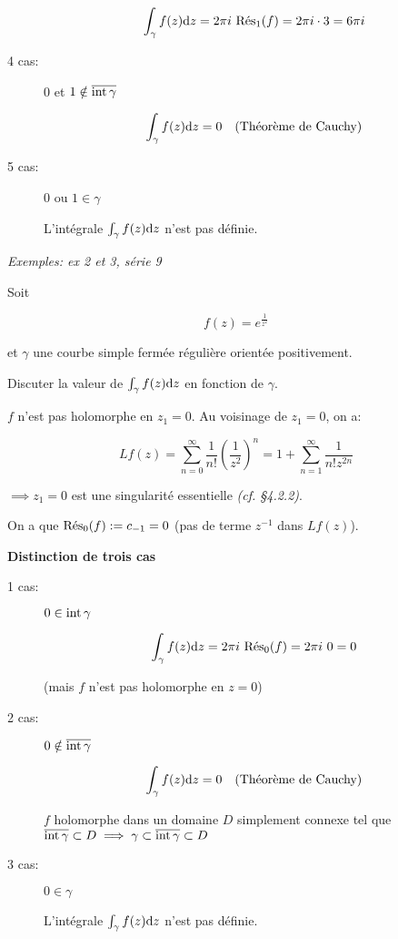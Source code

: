 \begin{example}[1]
\begin{description}
    \[ \int_\gamma f(z) \dz = 2\pi i \ \Res_{1}(f) = 2\pi i \cdot 3 = 6 \pi i \]
    
    \item[4\ieme{} cas:] 0 et $1 \notin \adh{\gamma}$
    
    \[ \int_\gamma f(z) \dz = 0 \quad \textrm{(Théorème de Cauchy)} \]
    
    \item[5\ieme{} cas:] 0 ou $1 \in \gamma$
    
    L'intégrale $\int_\gamma f(z) \dz$ n'est pas définie.
    \end{description}

    \textit{Exemples: ex 2 et 3, série 9}
\end{example}

\begin{example}[2]
    Soit
    
    \[ f(z) = e^{\frac{1}{z^2}} \]
    
    et $\gamma$ une courbe simple fermée régulière orientée positivement.
    
    Discuter la valeur de $\int_\gamma f(z) \dz$ en fonction de $\gamma$.
    
    $f$ n'est pas holomorphe en $z_1 = 0$.
    Au voisinage de $z_1 = 0$, on a:
    
    \[ Lf(z) = \sum_{n = 0}^\infty \frac{1}{n!} \left(\frac{1}{z^2}\right)^n =
    1 + \sum_{n = 1}^\infty \frac{1}{n!z^{2n}} \]
    
    $\implies z_1 = 0$ est une singularité essentielle \textit{(cf. §4.2.2)}.
    
    On a que $\Res_{0}(f) := c_{-1} = 0$ (pas de terme $z^{-1}$ dans $Lf(z)$).
    
    \textbf{Distinction de trois cas}
    
    \begin{description}
        \item[1\ier{} cas:] $0 \in \inte \gamma$
        
        \[ \int_\gamma f(z) \dz = 2\pi i \ \Res_{0}(f) = 2\pi i \ 0 = 0 \]
        
        (mais $f$ n'est pas holomorphe en $z = 0$)
        
        \item[2\ieme{} cas:] $0 \notin \adh{\gamma}$
        
        \[ \int_\gamma f(z) \dz = 0  \quad \textrm{(Théorème de Cauchy)} \]
        
        $f$ holomorphe dans un domaine $D$ simplement connexe tel que $\adh{\gamma} \subset D \implies \gamma \subset \adh{\gamma} \subset D$
        
        \item[3\ieme{} cas:] $0 \in \gamma$
        
        L'intégrale $\int_\gamma f(z) \dz$ n'est pas définie.
    \end{description}
\end{example}

